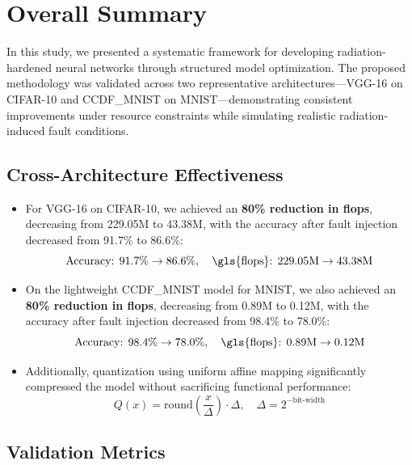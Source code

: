 \section{Overall Summary}

In this study, we presented a systematic framework for developing radiation-hardened neural networks through structured model optimization. The proposed methodology was validated across two representative architectures—VGG-16 on CIFAR-10 and CCDF\_MNIST on MNIST—demonstrating consistent improvements under resource constraints while simulating realistic radiation-induced fault conditions.

\subsection{Cross-Architecture Effectiveness}
    \begin{itemize}
        \item For VGG-16 on CIFAR-10, we achieved an \textbf{80\% reduction in \gls{flops}}, decreasing from 229.05M to 43.38M, with the accuracy after fault injection decreased from 91.7\% to 86.6\%:
        \begin{equation}
            \text{Accuracy: } 91.7\% \rightarrow 86.6\%,\quad \text{\gls{flops}: } 229.05\text{M} \rightarrow 43.38\text{M}
        \end{equation}
        
        \item On the lightweight CCDF\_MNIST model for MNIST, we also achieved an \textbf{80\% reduction in \gls{flops}}, decreasing from 0.89M to 0.12M, with the accuracy after fault injection decreased from 98.4\% to 78.0\%:
        \begin{equation}
            \text{Accuracy: } 98.4\% \rightarrow 78.0\%,\quad \text{\gls{flops}: } 0.89\text{M} \rightarrow 0.12\text{M}
        \end{equation}
        
        \item Additionally, quantization using uniform affine mapping significantly compressed the model without sacrificing functional performance:
        \begin{equation}
            Q(x) = \text{round}\left(\frac{x}{\Delta}\right) \cdot \Delta,\quad \Delta = 2^{-\text{bit-width}}
        \end{equation}
    \end{itemize}

   
    \subsection{Validation Metrics}
    
